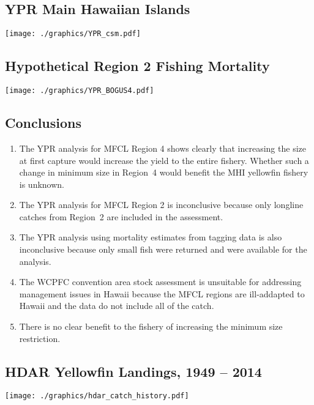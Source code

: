 \documentclass[a4paper,KOMA,landscape,titlepage]{powersem}
\begin{document}
\begin{slide}\section{YPR Main Hawaiian Islands}
\begin{center}
\texttt{[image: ./graphics/YPR\_csm.pdf]}
\end{center}
\end{slide}

\begin{slide}\section{Hypothetical Region 2 Fishing Mortality}
\begin{center}
\texttt{[image: ./graphics/YPR\_BOGUS4.pdf]}
\end{center}
\end{slide}

\begin{slide}\section{Conclusions}
\begin{enumerate}
\item The YPR analysis for MFCL Region 4 shows clearly that increasing
the size at first capture would increase the yield to the entire fishery.
Whether such a change in minimum size in Region~4 would
benefit the MHI yellowfin fishery is unknown.

\item The YPR analysis for MFCL Region 2 is inconclusive because only
longline catches from Region~2 are included in the assessment.

\item The YPR analysis using mortality estimates from tagging data is
also inconclusive because only small fish were returned and were
available for the analysis. 

\item The WCPFC convention area stock assessment is unsuitable for
addressing management issues in Hawaii because the
MFCL regions are ill-addapted to Hawaii and the data do not include
all of the catch.

\item There is no clear benefit to the fishery of increasing the
minimum size restriction.
\end{enumerate}
\end{slide}


\begin{slide}\section{HDAR Yellowfin Landings, 1949 -- 2014}
\begin{center}
\texttt{[image: ./graphics/hdar\_catch\_history.pdf]}
\end{center}
\end{slide}
\end{document}
